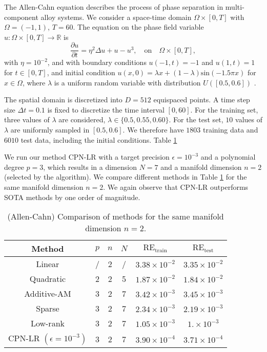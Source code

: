 

The Allen-Cahn equation describes the process of phase separation in multi-component alloy systems. We consider a space-time domain $\Omega \times [0, T] $ with 
$\Omega=(-1,1)$, $ T = 60 $. The equation on the phase field variable $ u : \Omega \times [0, T] \rightarrow \mathbb R $ is 
$$
    \frac{\partial u}{\partial t} = \eta^2 \Delta u + u - u^3,\quad \text{on} \quad \Omega \times [0, T],
$$
with $\eta =10^{-2} $, and with boundary conditions 
$
u(-1, t) = -1$ and $u(1, t) = 1
$ for $t\in [0,T]$, and initial condition 
$
u(x, 0) = \lambda x + (1-\lambda) \text{sin}(-1.5 \pi x)$ for $x\in \Omega$, where $\lambda$ is a uniform random variable with distribution   $U([0.5, 0.6])$ \cite{geelen2024}. 


The spatial domain is discretized into $D=512$ equispaced points. A time step size $\Delta t=0.1 $ is fixed to discretize the time interval $ [0, 60] $. For the training set, three values of $ \lambda $ are considered, $ \lambda \in \{0.5, 0.55, 0.60\} $. For the test set, $ 10 $ values of $ \lambda $ are uniformly sampled in $ [0.5, 0.6] $. We therefore have $1803$ training data and $6010$ test data, including the initial conditions. 
Table \ref{tab:allen_cahn_comparisons} 

We run our method CPN-LR with a target precision $\epsilon =10^{-3}$ and  a polynomial degree $p=3$, which results in a dimension $N = 7$ and a manifold dimension $ n= 2$ (selected by the algorithm).  We  compare  different  methods  in  Table  \ref{tab:allen_cahn_comparisons}  for  the same manifold dimension $n= 2$.  We again observe that CPN-LR outperforms SOTA methods by one order of magnitude. 

\begin{table}[h!]
\centering %

\begin{tabular}{|c|c|c|c|c|c|}
\hline
 Method & $p$  & $n$ & $N$ & $ \text{RE}_{\text{train}} $ & $ \text{RE}_{\text{test}} $ \\ 
 \hline
 Linear & / &  2  & / & $3.38 \times 10^{-2}$ & $3.35 \times 10^{-2}$ \\ 
 \hline
 Quadratic & 2 & 2 & 5 & $ 1.87 \times 10^{-2}$ & $ 1.84 \times 10^{-2}$ \\ 
 \hline
 Additive-AM & 3 & 2 & 7 & $ 3.42 \times 10^{-3}$ & $3.45 \times 10^{-3}$ \\
  \hline
 Sparse & 3 & 2 & 7 & $ 2.34 \times 10^{-3}$  & $ 2.19 \times 10^{-3} $ \\
 \hline
 Low-rank & 3 & 2 & 7 & $1.05 \times 10^{-3} $ & $ 1. \times 10^{-3}$ \\
 \hline
 CPN-LR $(\epsilon=10^{-3})$ & 3 & 2 & 7 & $ 3.90 \times 10^{-4} $ & $ 3.71 \times 10^{-4} $ \\ 
 \hline
\end{tabular}
\caption{(Allen-Cahn) Comparison of methods for the same manifold dimension $n=2$.}
\label{tab:allen_cahn_comparisons}
\end{table}

